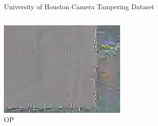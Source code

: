 \documentclass[10pt]{beamer}
\begin{document}
\begin{frame}{University of Houston Camera Tampering Dataset}
\begin{columns}
{            \includegraphics[width = \textwidth]{figures/rsvd_uhctd/OPfg_frame75.jpg}\\
            {\centering OP}
        }
\end{columns}
\end{frame}
\end{document}
